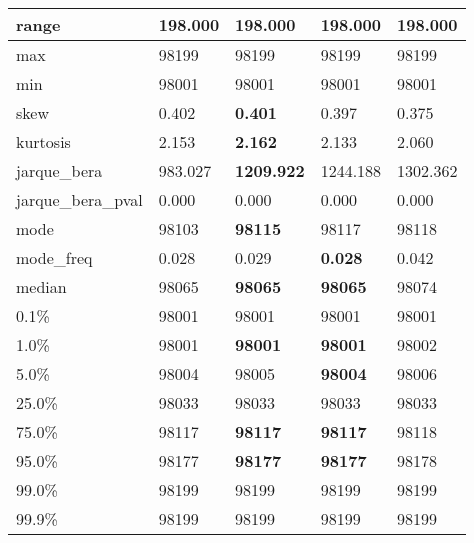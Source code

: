 \begin{table}[H]
\begin{tabular}{|l|m{10em}|m{10em}|m{10em}|m{10em}|}
\hline range & 198.000 & 198.000 & 198.000 & 198.000 \\
\hline max & 98199 & 98199 & 98199 & 98199 \\
\hline min & 98001 & 98001 & 98001 & 98001 \\
\hline skew & 0.402 & \bfseries 0.401 & 0.397 & \cellcolor[rgb]{0.9, 0.54, 0.52} 0.375 \\
\hline kurtosis & 2.153 & \bfseries 2.162 & 2.133 & \cellcolor[rgb]{0.9, 0.54, 0.52} 2.060 \\
\hline jarque\_bera & 983.027 & \bfseries 1209.922 & 1244.188 & \cellcolor[rgb]{0.9, 0.54, 0.52} 1302.362 \\
\hline jarque\_bera\_pval & 0.000 & 0.000 & 0.000 & 0.000 \\
\hline mode & 98103 & \bfseries 98115 & 98117 & \cellcolor[rgb]{0.9, 0.54, 0.52} 98118 \\
\hline mode\_freq & 0.028 & 0.029 & \bfseries 0.028 & \cellcolor[rgb]{0.9, 0.54, 0.52} 0.042 \\
\hline median & 98065 & \bfseries 98065 & \bfseries 98065 & \cellcolor[rgb]{0.9, 0.54, 0.52} 98074 \\
\hline 0.1\% & 98001 & 98001 & 98001 & 98001 \\
\hline 1.0\% & 98001 & \bfseries 98001 & \bfseries 98001 & \cellcolor[rgb]{0.9, 0.54, 0.52} 98002 \\
\hline 5.0\% & 98004 & 98005 & \bfseries 98004 & \cellcolor[rgb]{0.9, 0.54, 0.52} 98006 \\
\hline 25.0\% & 98033 & 98033 & 98033 & 98033 \\
\hline 75.0\% & 98117 & \bfseries 98117 & \bfseries 98117 & \cellcolor[rgb]{0.9, 0.54, 0.52} 98118 \\
\hline 95.0\% & 98177 & \bfseries 98177 & \bfseries 98177 & \cellcolor[rgb]{0.9, 0.54, 0.52} 98178 \\
\hline 99.0\% & 98199 & 98199 & 98199 & 98199 \\
\hline 99.9\% & 98199 & 98199 & 98199 & 98199 \\
\hline
\end{tabular}
\end{table}
